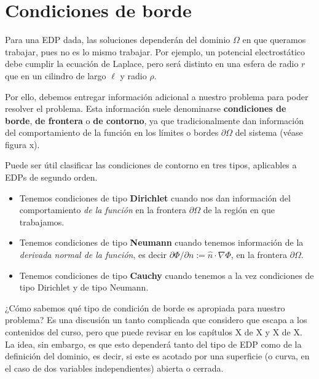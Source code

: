 

\section{Condiciones de borde}

Para una EDP dada, las soluciones dependerán del dominio $\Omega$ en que queramos trabajar, pues no es lo mismo trabajar. Por ejemplo, un potencial electrostático debe cumplir la ecuación de Laplace, pero será distinto en una esfera de radio $r$ que en un cilindro de largo $\ell$ y radio $\rho$. 

Por ello, debemos entregar información adicional a nuestro problema para poder resolver el problema. Esta información suele denominarse \textbf{condiciones de borde}, \textbf{de frontera} o \textbf{de contorno}, ya que tradicionalmente dan información del comportamiento de la función en los límites o bordes $\partial \Omega$ del sistema (véase figura x).

Puede ser útil clasificar las condiciones de contorno en tres tipos, aplicables a EDPs de segundo orden.

\begin{itemize}
    \item Tenemos condiciones de tipo \textbf{Dirichlet} cuando nos dan información del comportamiento \emph{de la función} en la frontera $\partial \Omega$ de la región en que trabajamos.
    \item Tenemos condiciones de tipo \textbf{Neumann} cuando tenemos información de la \emph{derivada normal de la función}, es decir $\partial \Phi/\partial n := \hat{n} \cdot \nabla \Phi$, en la frontera $\partial \Omega$.
    \item Tenemos condiciones de tipo \textbf{Cauchy} cuando tenemos a la vez condiciones de tipo Dirichlet y de tipo Neumann.
\end{itemize} 

¿Cómo sabemos qué tipo de condición de borde es apropiada para nuestro problema? Es una discusión un tanto complicada que considero que escapa a los contenidos del curso, pero que puede revisar en los capítulos X de X y X de X. La idea, sin embargo, es que esto dependerá tanto del tipo de EDP como de la definición del dominio, es decir, si este es acotado por una superficie (o curva, en el caso de dos variables independientes) abierta o cerrada.

